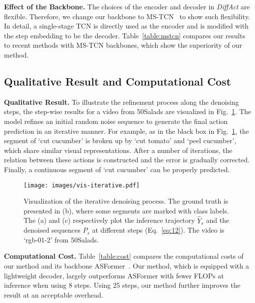 \documentclass[10pt,twocolumn,letterpaper]{article}
\begin{document}
\textbf{Effect of the Backbone.}
The choices of the encoder and decoder in \textit{DiffAct} are flexible. 
Therefore, we change our backbone to MS-TCN~\cite{2019_CVPR_Farha} to show such flexibility.
In detail, a single-stage TCN is directly used as the encoder and is modified with the step embedding to be the decoder.
Table~\ref{table:mstcn} compares our results to recent methods with MS-TCN backbones, which show the superiority of our method.




\subsection{Qualitative Result and Computational Cost}

\textbf{Qualitative Result.} 
To illustrate the refinement process along the denoising steps, the step-wise results for a video from 50Salads are visualized in Fig.~\ref{fig:vis-iterative}.
The model refines an initial random noise sequence to generate the final action prediction in an iterative manner. For example, as in the black box in Fig.~\ref{fig:vis-iterative}, the segment of `cut cucumber' is broken up by `cut tomato' and `peel cucumber', which share similar visual representations. After a number of iterations, the relation between these actions is constructed and the error is gradually corrected. Finally, a continuous segment of `cut cucumber' can be properly predicted.


\begin{figure}[t]
\begin{center}
   \texttt{[image: images/vis-iterative.pdf]}
\end{center}
    \caption{Visualization of the iterative denoising process. The ground truth is presented in (b), where some segments are marked with class labels. The (a) and (c) respectively plot the inference trajectory ${\hat{Y}}_{s}$ and the denoised sequences $P_s$ at different steps (Eq.~\ref{eq:12}). The video is `rgb-01-2' from 50Salads.}
\label{fig:vis-iterative}
\end{figure}



\textbf{Computational Cost.} 
Table~\ref{table:cost} compares the computational costs of our method and its backbone ASFormer~\cite{2021_BMVC_Yi}.
Our method, which is equipped with a lightweight decoder, largely outperforms ASFormer with fewer FLOPs at inference when using 8 steps.
Using 25 steps, our method further improves the result at an acceptable overhead.
\end{document}
